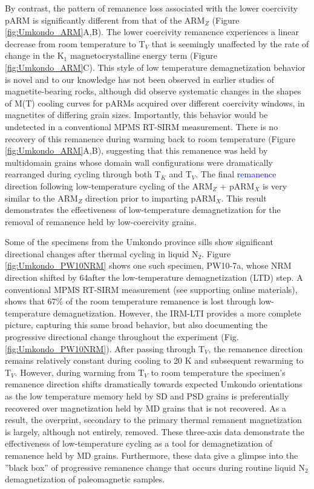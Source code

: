 \documentclass[draft,gc]{AGUTeX}
\begin{document}
\begin{article}
By contrast, the pattern of remanence loss associated with the lower coercivity pARM is significantly different from that of the ARM$_{Z}$ (Figure \ref{fig:Umkondo_ARM}A,B). The lower coercivity remanence experiences a linear decrease from room temperature to T$_{V}$ that is seemingly unaffected by the rate of change in the K$_{1}$ magnetocrystalline energy term (Figure \ref{fig:Umkondo_ARM}C). This style of low temperature demagnetization behavior is novel and to our knowledge has not been observed in earlier studies of magnetite-bearing rocks, although \cite{Muxworthy2003a} did observe systematic changes in the shapes of M(T) cooling curves for pARMs acquired over different coercivity windows, in magnetites of differing grain sizes. Importantly, this behavior would be undetected in a conventional MPMS RT-SIRM measurement. There is no recovery of this remanence during warming back to room temperature (Figure \ref{fig:Umkondo_ARM}A,B), suggesting that this remanence was held by multidomain grains whose domain wall configurations were dramatically rearranged during cycling through both T$_{K}$ and T$_{V}$. The final \textcolor{blue}{remanence} direction following low-temperature cycling of the ARM$_{Z}$ + pARM$_{X}$ is very similar to the ARM$_{Z}$ direction prior to imparting pARM$_{X}$. This result demonstrates  the effectiveness of low-temperature demagnetization for the removal of remanence held by low-coercivity grains.

Some of the specimens from the Umkondo province sills show significant directional changes after thermal cycling in liquid N$_{2}$. Figure \ref{fig:Umkondo_PW10NRM} shows one such specimen, PW10-7a, whose NRM direction shifted by 64\textdegree after the low-temperature demagnetization (LTD) step. A conventional MPMS RT-SIRM measurement (see supporting online materials),  shows that 67\% of the room temperature remanence is lost through low-temperature demagnetization. However, the IRM-LTI provides a more complete picture, capturing this same broad behavior, but also documenting the progressive directional change throughout the experiment (Fig. \ref{fig:Umkondo_PW10NRM}). After passing through T$_{V}$, the remanence direction remains relatively constant during cooling to 20 K and subsequent rewarming to T$_{V}$. However, during warming from T$_{V}$ to room temperature the specimen's remanence direction shifts dramatically towards expected Umkondo orientations as the low temperature memory held by SD and PSD grains is preferentially recovered over magnetization held by MD grains that is not recovered. As a result, the overprint, secondary to the primary thermal remanent magnetization is largely, although not entirely, removed. These three-axis data demonstrate the effectiveness of low-temperature cycling as a tool for demagnetization of remanence held by MD grains. Furthermore, these data give a glimpse into the ''black box'' of progressive remanence change that occurs during routine liquid N$_2$ demagnetization of paleomagnetic samples.


\end{article}
\end{document}
